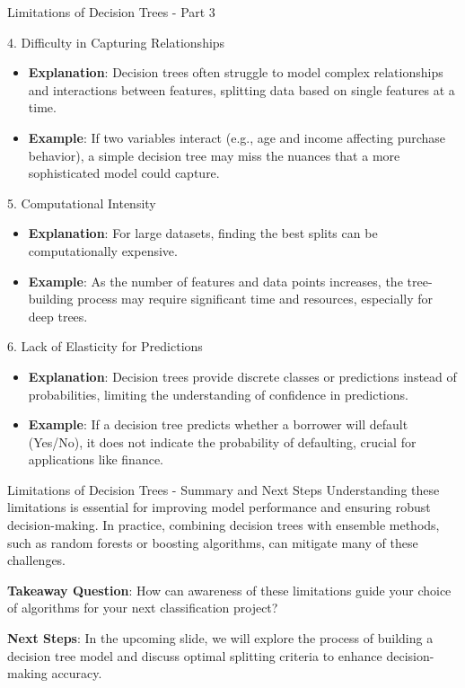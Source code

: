 \documentclass[aspectratio=169]{beamer}
\begin{document}
\begin{frame}[fragile]{Limitations of Decision Trees - Part 3}
  \begin{block}{4. Difficulty in Capturing Relationships}
    \begin{itemize}
      \item \textbf{Explanation}: Decision trees often struggle to model complex relationships and interactions between features, splitting data based on single features at a time.
      \item \textbf{Example}: If two variables interact (e.g., age and income affecting purchase behavior), a simple decision tree may miss the nuances that a more sophisticated model could capture.
    \end{itemize}
  \end{block}

  \begin{block}{5. Computational Intensity}
    \begin{itemize}
      \item \textbf{Explanation}: For large datasets, finding the best splits can be computationally expensive.
      \item \textbf{Example}: As the number of features and data points increases, the tree-building process may require significant time and resources, especially for deep trees.
    \end{itemize}
  \end{block}

  \begin{block}{6. Lack of Elasticity for Predictions}
    \begin{itemize}
      \item \textbf{Explanation}: Decision trees provide discrete classes or predictions instead of probabilities, limiting the understanding of confidence in predictions.
      \item \textbf{Example}: If a decision tree predicts whether a borrower will default (Yes/No), it does not indicate the probability of defaulting, crucial for applications like finance.
    \end{itemize}
  \end{block}
\end{frame}

\begin{frame}[fragile]{Limitations of Decision Trees - Summary and Next Steps}
  Understanding these limitations is essential for improving model performance and ensuring robust decision-making. In practice, combining decision trees with ensemble methods, such as random forests or boosting algorithms, can mitigate many of these challenges.

  \textbf{Takeaway Question}: How can awareness of these limitations guide your choice of algorithms for your next classification project?

  \textbf{Next Steps}: In the upcoming slide, we will explore the process of building a decision tree model and discuss optimal splitting criteria to enhance decision-making accuracy.
\end{frame}
\end{document}
